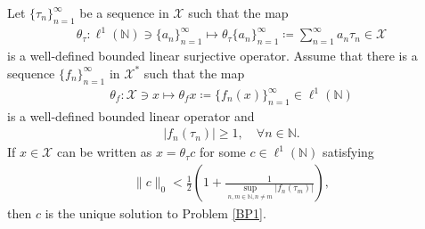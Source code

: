 \documentclass[10pt,a4paper]{amsart}
\begin{document}
\begin{theorem}\label{TDP}
	Let $\{\tau_n \}_{n=1}^\infty$ be a sequence in  $\mathcal{X}$ such that the map 
	\begin{align*}
		\theta_\tau:\ell^1(\mathbb{N})\ni \{a_n \}_{n=1}^\infty\mapsto \theta_\tau \{a_n \}_{n=1}^\infty\coloneqq \sum_{n=1}^{\infty}a_n\tau_n \in \mathcal{X} 
	\end{align*}
	is a well-defined bounded linear surjective operator. Assume that there is a sequence $\{f_n \}_{n =1}^\infty$ in $\mathcal{X}^*$ such that the map 
	\begin{align}\label{L}
		\theta_f: \mathcal{X} \ni x \mapsto \theta_fx\coloneqq \{f_n(x) \}_{n =1}^\infty \in \ell^1(\mathbb{N})
	\end{align}
	is a well-defined bounded linear operator and 
	 \begin{align}\label{N}
	|f_n(\tau_n)|\geq1, \quad \forall n \in \mathbb{N}.
\end{align}
	If $x \in \mathcal{X}$ can be written as  $	x=\theta_\tau c$ for some  $c \in \ell^1(\mathbb{N})$ satisfying 
\begin{align}\label{I}
\|c\|_0<\frac{1}{2}\left(1+\frac{1}{\displaystyle\sup_{n, m \in \mathbb{N}, n \neq m}| f_n(\tau_m)|}\right),	
\end{align}
then $c$ is the unique solution to Problem \ref{BP1}.
\end{theorem}
\end{document}
